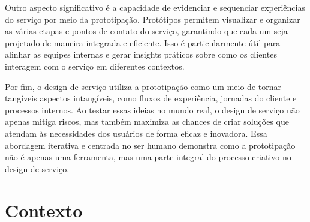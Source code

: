Outro aspecto significativo é a capacidade de evidenciar e sequenciar experiências do serviço por meio da prototipação. Protótipos permitem visualizar e organizar as várias etapas e pontos de contato do serviço, garantindo que cada um seja projetado de maneira integrada e eficiente. Isso é particularmente útil para alinhar as equipes internas e gerar insights práticos sobre como os clientes interagem com o serviço em diferentes contextos.

Por fim, o design de serviço utiliza a prototipação como um meio de tornar tangíveis aspectos intangíveis, como fluxos de experiência, jornadas do cliente e processos internos. Ao testar essas ideias no mundo real, o design de serviço não apenas mitiga riscos, mas também maximiza as chances de criar soluções que atendam às necessidades dos usuários de forma eficaz e inovadora. Essa abordagem iterativa e centrada no ser humano demonstra como a prototipação não é apenas uma ferramenta, mas uma parte integral do processo criativo no design de serviço.




\section{Contexto}
